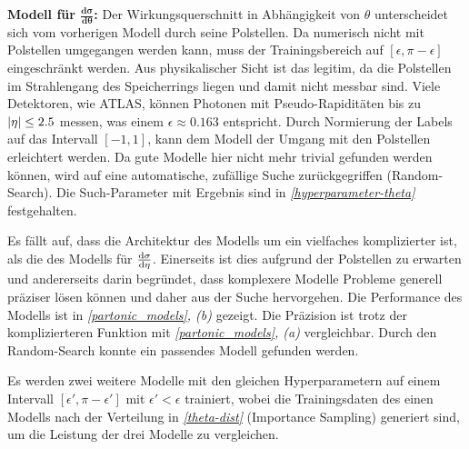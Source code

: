 \textbf{Modell für $\mathbf{\frac{d\sigma}{d\theta}}$:} %
Der Wirkungsquerschnitt in Abhängigkeit von $\theta$ unterscheidet sich vom vorherigen Modell durch seine Polstellen. Da numerisch nicht mit Polstellen umgegangen werden kann, muss der Trainingsbereich auf $[\epsilon, \pi-\epsilon]$ eingeschränkt werden. Aus physikalischer Sicht ist das legitim, da die Polstellen im Strahlengang des Speicherrings liegen und damit nicht messbar sind. Viele Detektoren, wie ATLAS, können Photonen mit Pseudo-Rapiditäten bis zu $\abs{\eta} \leq 2.5$ messen, was einem $\epsilon \approx 0.163$ entspricht. Durch Normierung der Labels auf das Intervall $[-1, 1]$, kann dem Modell der Umgang mit den Polstellen erleichtert werden. Da gute Modelle hier nicht mehr trivial gefunden werden können, wird auf eine automatische, zufällige Suche zurückgegriffen (Random-Search). Die Such-Parameter mit Ergebnis sind in \textit{\autoref{hyperparameter-theta}} festgehalten.

Es fällt auf, dass die Architektur des Modells um ein vielfaches komplizierter ist, als die des Modells für $\derivative{\sigma}{\eta}$. Einerseits ist dies aufgrund der Polstellen zu erwarten und andererseits darin begründet, dass komplexere Modelle Probleme generell präziser lösen können und daher aus der Suche hervorgehen. Die Performance des Modells ist in \textit{\autoref{partonic_models}, (b)} gezeigt. Die Präzision ist trotz der komplizierteren Funktion mit \textit{\autoref{partonic_models}, (a)} vergleichbar. Durch den Random-Search konnte ein passendes Modell gefunden werden. %

Es werden zwei weitere Modelle mit den gleichen Hyperparametern auf einem Intervall $[\epsilon', \pi-\epsilon']$ mit $\epsilon' < \epsilon$ trainiert, wobei die Trainingsdaten des einen Modells nach der Verteilung in \textit{\autoref{theta-dist}} (Importance Sampling) generiert sind, um die Leistung der drei Modelle zu vergleichen.

